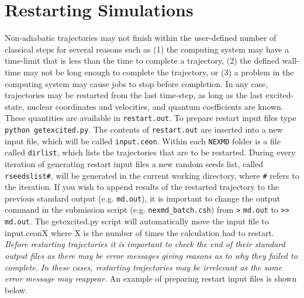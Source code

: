 \documentclass[letterpaper,12pt,titlepage]{article}
\begin{document}
  
\section{Restarting Simulations}
\label{restart}
Non-adiabatic trajectories may not finish within the user-defined number of classical steps for several reasons such as (1) the computing system may have a time-limit that is less than the time to complete a trajectory, (2) the defined wall-time may not be long enough to complete the trajectory, or (3) a problem in the computing system may cause jobs to stop before completion.  In any case, trajectories may be restarted from the last time-step, as long as the last excited-state, nuclear coordinates and velocities, and quantum coefficients are known.  These quantities are available in \verb+restart.out+.  To prepare restart input files type \verb+python getexcited.py+.  The contents of \verb+restart.out+ are inserted into a new input file, which will be called \verb+input.ceon+.  Within each \verb+NEXMD+ folder is a file called \verb+dirlist+, which lists the trajectories that are to be restarted.  During every iteration of generating restart input files a new random seeds list, called \verb+rseedslist#+, will be generated in the current working directory, where \verb+#+ refers to the iteration.  If you wish to append results of the restarted trajectory to the previous standard output (e.g. \verb+md.out+), it is important to change the output command in the submission script (e.g. \verb+nexmd_batch.csh+) from \verb+>+ \verb+md.out+ to \verb+>>+ \verb+md.out+.  The getexcited.py script will automatically move the input file to input.ceonX where X is the number of times the calculation had to restart.  \textit{Before restarting trajectories it is important to check the end of their standard output files as there may be error messages giving reasons as to why they failed to complete.  In these cases, restarting trajectories may be irrelevant as the same error message may reappear.}  An example of preparing restart input files is shown below.
\end{document}
